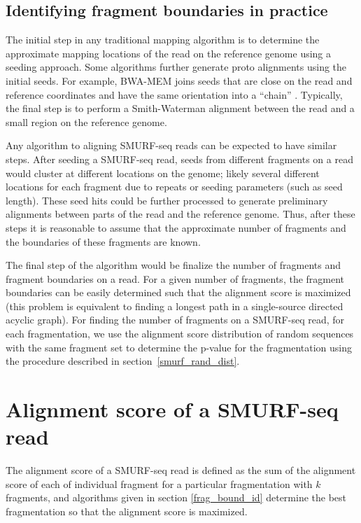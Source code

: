 \subsection{Identifying fragment boundaries in practice}
The initial step in any traditional mapping algorithm is to determine
the approximate mapping locations of the read on the reference genome
using a seeding approach.
%
Some algorithms further generate proto alignments using the initial
seeds.  For example, BWA-MEM joins seeds that are close on the read and
reference coordinates and have the same orientation into a ``chain''
\citep{li2013aligning}.
%
Typically, the final step is to perform a Smith-Waterman alignment
between the read and a small region on the reference genome.

Any algorithm to aligning SMURF-seq reads can be expected to have
similar steps. After seeding a SMURF-seq read, seeds from different
fragments on a read would cluster at different locations on the genome;
likely several different locations for each fragment due to repeats or
seeding parameters (such as seed length).
%
These seed hits could be further processed to generate preliminary
alignments between parts of the read and the reference genome.
%
Thus, after these steps it is reasonable to assume that the approximate
number of fragments and the boundaries of these fragments are known.

The final step of the algorithm would be finalize the number of
fragments and fragment boundaries on a read. For a given number of
fragments, the fragment boundaries can be easily determined such that
the alignment score is maximized (this problem is equivalent to finding
a longest path in a single-source directed acyclic graph).
%
For finding the number of fragments on a SMURF-seq read, for each
fragmentation, we use the alignment score distribution of random
sequences with the same fragment set to determine the p-value for the
fragmentation using the procedure described in
section~\ref{smurf_rand_dist}.



\section{Alignment score of a SMURF-seq read}
\label{smurf_aln_score}
The alignment score of a SMURF-seq read is defined as the sum of the
alignment score of each of individual fragment for a particular
fragmentation with $k$ fragments, and algorithms given in section
\ref{frag_bound_id} determine the best fragmentation so that the
alignment score is maximized.

